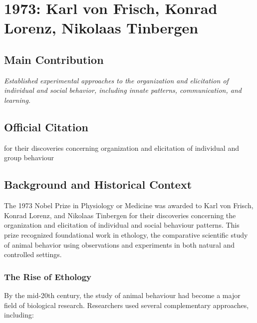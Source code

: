 \chapter[1973 --- von Frisch, Lorenz, and Tinbergen]{1973: Karl von Frisch, Konrad Lorenz, Nikolaas Tinbergen}
\label{ch:1973_Frisch}

\section*{Main Contribution}

\textit{Established experimental approaches to the organization and elicitation of individual and social behavior, including innate patterns, communication, and learning.}\cite{nobel-1973,lecture-1973,lecture-lorenz-1973,lecture-tinbergen-1973}

\section{Official Citation}

for their discoveries concerning organization and elicitation of individual and group behaviour

\section{Background and Historical Context}

The 1973 Nobel Prize in Physiology or Medicine was awarded to Karl von Frisch, Konrad Lorenz, and Nikolaas Tinbergen for their discoveries concerning the organization and elicitation of individual and social behaviour patterns. This prize recognized foundational work in ethology, the comparative scientific study of animal behavior using observations and experiments in both natural and controlled settings.

\subsection{The Rise of Ethology}

By the mid-20th century, the study of animal behaviour had become a major field of biological research. Researchers used several complementary approaches, including:

